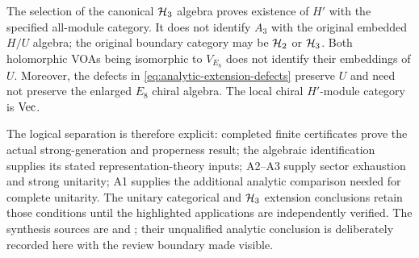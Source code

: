 \begin{remark}
\label{rem:analytic-extension-scope}
The selection of the canonical $\HH_3$ algebra proves existence of
$H'$ with the specified all-module category.  It does not identify
$A_3$ with the original embedded $H/U$ algebra; the original boundary
category may be $\HH_2$ or $\HH_3$.  Both holomorphic VOAs being
isomorphic to $V_{E_8}$ does not identify their embeddings of $U$.
Moreover, the defects in \eqref{eq:analytic-extension-defects} preserve
$U$ and need not preserve the enlarged $E_8$ chiral algebra.
The local chiral $H'$-module category is $\Vec$.
\end{remark}

The logical separation is therefore explicit: completed finite
certificates prove the actual strong-generation and properness result;
the algebraic identification supplies its stated representation-theory
inputs; A2--A3 supply sector exhaustion and strong unitarity; A1 supplies
the additional analytic comparison needed for complete unitarity.
The unitary categorical and $\HH_3$ extension conclusions retain those
conditions until the highlighted applications are independently verified.
The synthesis sources are
 and
; their unqualified
analytic conclusion is deliberately recorded here with the review boundary
made visible.

